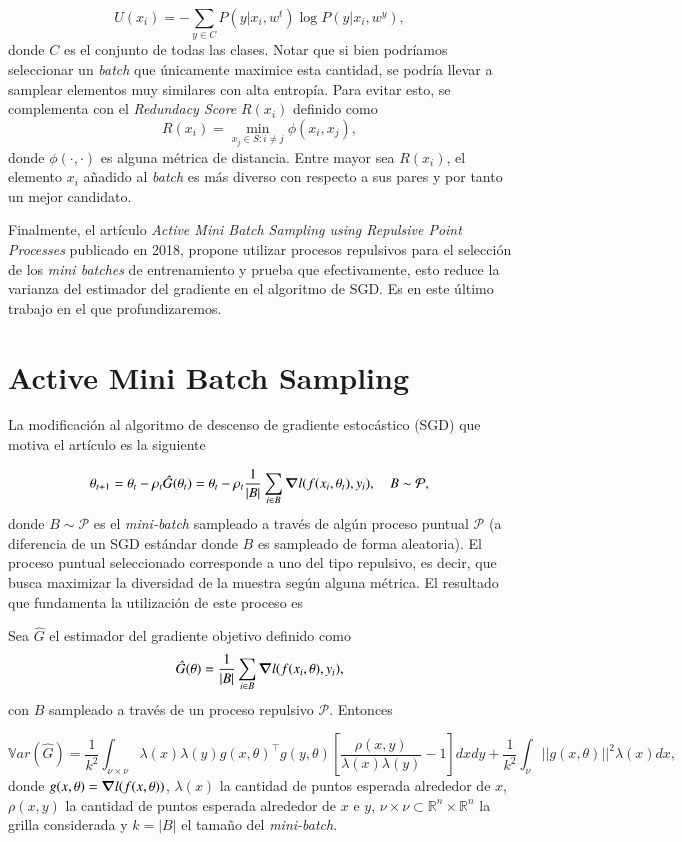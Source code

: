 \[
U(x_i) = - \sum_{y \in C} P(y | x_i, w^t)\log P(y | x_i, w^y) , 
\]
donde $C$ es el conjunto de todas las clases. Notar que si bien podríamos seleccionar un \textit{batch} que únicamente maximice esta cantidad, se podría llevar a samplear elementos muy similares con alta entropía. Para evitar esto, se complementa con el \textit{Redundacy Score} $R(x_i)$ definido como
\[
R(x_i) = \min_{x_j \in S: i \neq j}\phi(x_i,x_j) , 
\]
donde $\phi(\cdot, \cdot)$ es alguna métrica de distancia. Entre mayor sea $R(x_i)$, el elemento $x_i$ añadido al \textit{batch} es más diverso con respecto a sus pares y por tanto un mejor candidato.    

\vspace{0.2cm}

Finalmente, el artículo \textit{Active Mini Batch Sampling using Repulsive Point Processes} \cite{https://doi.org/10.48550/arxiv.1804.02772} publicado en 2018, propone utilizar procesos repulsivos para el selección de los \textit{mini batches} de entrenamiento y prueba que efectivamente, esto reduce la varianza del estimador del gradiente en el algoritmo de SGD. Es en este último trabajo en el que profundizaremos. 


\section{Active Mini Batch Sampling}


La modificación al algoritmo de descenso de gradiente estocástico (SGD) que motiva el artículo \cite{https://doi.org/10.48550/arxiv.1804.02772} es la siguiente

\[
\theta_{t+1} = \theta_t - \rho_t \hat{G}(\theta_t) = \theta_t - \rho_t \frac{1}{|B|}\sum_{i \in B}\grad l(f(x_i , \theta_t),y_i), \quad B \sim \mathcal{P} , 
\] donde $B \sim \mathcal{P}$ es el \textit{mini-batch} sampleado a través de algún proceso puntual $\mathcal{P}$ (a diferencia de un SGD estándar donde $B$ es sampleado de forma aleatoria). El proceso puntual seleccionado corresponde a uno del tipo repulsivo, es decir, que busca maximizar la diversidad de la muestra según alguna métrica. El resultado que fundamenta la utilización de este proceso es 

\begin{teo}
Sea $\hat{G}$ el estimador del gradiente objetivo definido como 
\[
\hat{G}(\theta) = \frac{1}{|B|}\sum_{i \in B}\grad l(f(x_i , \theta),y_i) , 
\]
con $B$ sampleado a través de un proceso repulsivo $\mathcal{P}$. Entonces 

\[
    \mathbb{V}ar(\hat{G}) = \frac{1}{k^2}\int_{\nu \times \nu}\lambda(x)\lambda(y)g(x,\theta)^{\top}g(y,\theta)\left [ \frac{\rho(x,y)}{\lambda(x)\lambda(y)} - 1\right ]dxdy
    + \frac{1}{k^2} \int_{\nu} ||g(x,\theta)||^2\lambda(x)dx ,
\] donde $g(x,\theta) = \grad l(f(x, \theta))$, $\lambda(x)$ la cantidad de puntos esperada alrededor de $x$, $\rho(x,y)$ la cantidad de puntos esperada alrededor de $x$ e $y$, $\nu \times \nu \subset \mathbb{R}^n \times \mathbb{R}^n$ la grilla considerada y $k = |B|$ el tamaño del \textit{mini-batch}.
\end{teo}

